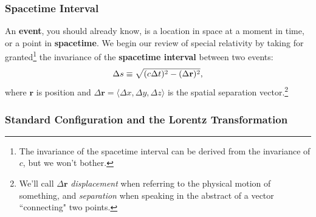 \documentclass[12pt]{article}
\renewcommand{\vv}[1]{\mathbf{#1}}
\begin{document}
\subsubsection{Spacetime Interval}

An \textbf{event}, you should already know, is a location in space at a moment in time, or a point in \textbf{spacetime}. We begin our review of special relativity by taking for granted\footnote{The invariance of the spacetime interval can be derived from the invariance of $c$, but we won't bother.} the invariance of the \textbf{spacetime interval} between two events:
\begin{equation}\label{eq:sti}
\Delta s \equiv \sqrt{ (c \mkern.5mu \Delta t)^2 - ( \Delta \vv r )^2 } ,
\end{equation}
where $\vv r$ is position and ${\Delta \vv r = \langle \Delta x, \Delta y, \Delta z \rangle}$ is the spatial separation vector.\footnote{We'll call $\Delta \vv r$ \emph{displacement} when referring to the physical motion of something, and \emph{separation} when speaking in the abstract of a vector ``connecting" two points.}


\subsubsection{Standard Configuration and the Lorentz Transformation}\label{sssec:lt}
\end{document}
